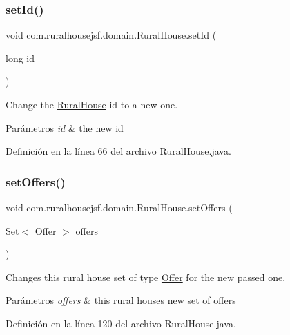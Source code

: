 \subsubsection{\texorpdfstring{setId()}{setId()}}
{\footnotesize\ttfamily void com.\+ruralhousejsf.\+domain.\+Rural\+House.\+set\+Id (\begin{DoxyParamCaption}\item[{long}]{id }\end{DoxyParamCaption})}



Change the \mbox{\hyperlink{a00188}{Rural\+House}} id to a new one. 


\begin{DoxyParams}{Parámetros}
{\em id} & the new id \\
\hline
\end{DoxyParams}


Definición en la línea 66 del archivo Rural\+House.\+java.

\mbox{\label{a00188_a6edffd501fd0be08f923be5a1615e1fb}} 
\subsubsection{\texorpdfstring{setOffers()}{setOffers()}}
{\footnotesize\ttfamily void com.\+ruralhousejsf.\+domain.\+Rural\+House.\+set\+Offers (\begin{DoxyParamCaption}\item[{Set$<$ \mbox{\hyperlink{a00184}{Offer}} $>$}]{offers }\end{DoxyParamCaption})}



Changes this rural house set of type \mbox{\hyperlink{a00184}{Offer}} for the new passed one. 


\begin{DoxyParams}{Parámetros}
{\em offers} & this rural houses new set of offers \\
\hline
\end{DoxyParams}


Definición en la línea 120 del archivo Rural\+House.\+java.

\mbox{\label{a00188_a33c5888213bc3b3f5a4d3c0015f9d033}} 
